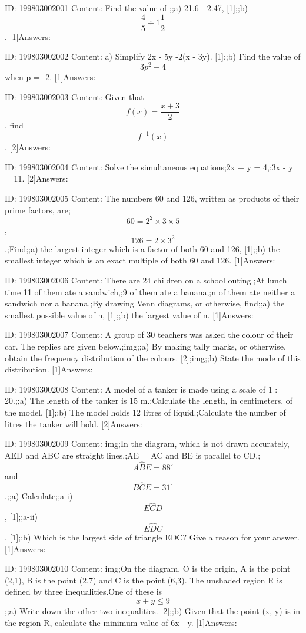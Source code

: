 \documentclass{article}
\begin{document}
ID: 199803002001
Content:
Find the value of ;;a) 21.6  - 2.47, [1];;b) $$\frac{4}{5} \div 1 \frac{1}{2}$$. [1]Answers:

ID: 199803002002
Content:
a) Simplify 2x - 5y -2(x - 3y). [1];;b) Find the value of $$3p^2 + 4$$ when p = -2. [1]Answers:

ID: 199803002003
Content:
Given that $$f(x) = \frac{x+3}{2}$$, find $$f^{-1}(x)$$. [2]Answers:

ID: 199803002004
Content:
Solve the simultaneous equations;2x + y = 4,;3x - y = 11. [2]Answers:

ID: 199803002005
Content:
The numbers 60 and 126, written as products of their prime factors, are;$$60 = 2^2 \times 3 \times 5$$,  $$126 = 2 \times 3^2$$.;Find;;a) the largest integer which is a factor of both 60 and 126, [1];;b) the smallest integer which is an exact multiple of both 60 and 126. [1]Answers:

ID: 199803002006
Content:
There are 24 children on a school outing.;At lunch time 11 of them ate a sandwich,;9 of them ate a banana,;n of them ate neither a sandwich nor a banana.;By drawing Venn diagrams, or otherwise, find;;a) the smallest possible value of n, [1];;b) the largest value of n. [1]Answers:

ID: 199803002007
Content:
A group of 30 teachers was asked the colour of their car. The replies are given below.;img;;a) By making tally marks, or otherwise, obtain the frequency distribution of the colours. [2];img;;b) State the mode of this distribution. [1]Answers:

ID: 199803002008
Content:
A model of a tanker is made using a scale of 1 : 20.;;a) The length of the tanker is 15 m.;Calculate the length, in centimeters, of the model. [1];;b) The model holds 12 litres of liquid.;Calculate the number of litres the tanker will hold. [2]Answers:

ID: 199803002009
Content:
img;In the diagram, which is not drawn accurately, AED and ABC are straight lines.;AE = AC and BE is parallel to CD.;$$A \hat BE = 88^{\circ}$$ and $$B \hat CE = 31^{\circ}$$.;;a) Calculate;;a-i) $$E \hat CD$$, [1];;a-ii) $$E \hat DC$$. [1];;b) Which is the largest side of triangle EDC? Give a reason for your answer. [1]Answers:

ID: 199803002010
Content:
img;On the diagram, O is the origin, A is the point (2,1), B is the point (2,7) and C is the point (6,3). The unshaded region R is defined by three inequalities.One of these is $$x + y \leq 9$$;;a) Write down the other two inequalities. [2];;b) Given that the point (x, y) is in the region R, calculate the minimum value of 6x - y. [1]Answers:
\end{document}

